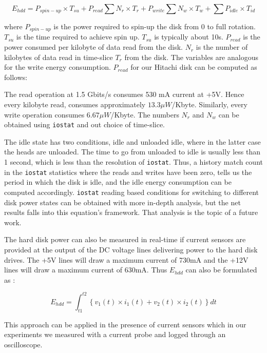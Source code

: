 \documentclass[times, 10pt,onecolumn]{article}
\begin{document}
\begin{equation}
\label{eqn:hddpwr1}
E_{hdd} = P_{spin-up}\times T_{su}  +  P_{read}\sum N_r\times T_r + P_{write}\sum N_w\times T_w + \sum P_{idle}\times T_{id}
\end{equation}

where $P_{spin-up}$ is the power required to spin-up the disk from 0 to
full rotation. $T_{su}$ is the time required to achieve spin
up. $T_{su}$ is typically about 10s. $P_{read}$ is the power consumed
per kilobyte of data read from the disk. $N_r$ is the number of
kilobytes of data read in time-slice $T_r$ from the disk. The variables
are analogous for the write energy consumption. $P_{read}$ for our
Hitachi disk can be computed as follows:

The read operation at 1.5 Gbits/s consumes 530 mA current at +5V. Hence
every kilobyte read, consumes approximately $13.3 \mu
W$/Kbyte. Similarly, every write operation consumes $6.67 \mu
W$/Kbyte. The numbers $N_r$ and $N_w$ can be obtained using
\texttt{iostat} and out choice of time-slice.

The idle state has two conditions, idle and unloaded idle, where in the
latter case the heads are unloaded. The time to go from unloaded to idle
is usually less than 1 second, which is less than the resolution of
\texttt{iostat}. Thus, a history match count in the \texttt{iostat}
statistics where the reads and writes have been zero, tells us the
period in which the disk is idle, and the idle energy consumption can be
computed accordingly. \texttt{iostat} reading based conditions for
switching to different disk power states can be obtained with more
in-depth analysis, but the net results falls into this equation's
framework. That analysis is the topic of a future work.

The hard disk power can also be measured in real-time if current sensors
are provided at the output of the DC voltage lines delivering power to
the hard disk drives. The +5V lines will draw a maximum current of 730mA
and the +12V lines will draw a maximum current of 630mA. Thus $E_{hdd}$
can also be formulated as :

\begin{equation}
\label{eqn:hddpwr2}
E_{hdd} =  \int_{t1}^{t2} \left \{ v_1(t)\times i_1(t) + v_2(t)\times i_2(t) \right \} dt
\end{equation}

This approach can be applied in the presence of current sensors which in
our experiments we measured with a current probe and logged through an
oscilloscope.
\end{document}
